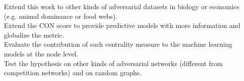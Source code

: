 \documentclass[preview]{standalone}
\begin{document}
Extend this work to other kinds of adversarial datasets in biology or economics (e.g. animal dominance or food webs).\\Extend the CON score to provide predictive models with more information and globalize the metric.\\Evaluate the contribution of each centrality measure to the machine learning models at the node level.\\Test the hypothesis on other kinds of adversarial networks (different from competition networks) and on random graphs.\\
\end{document}
